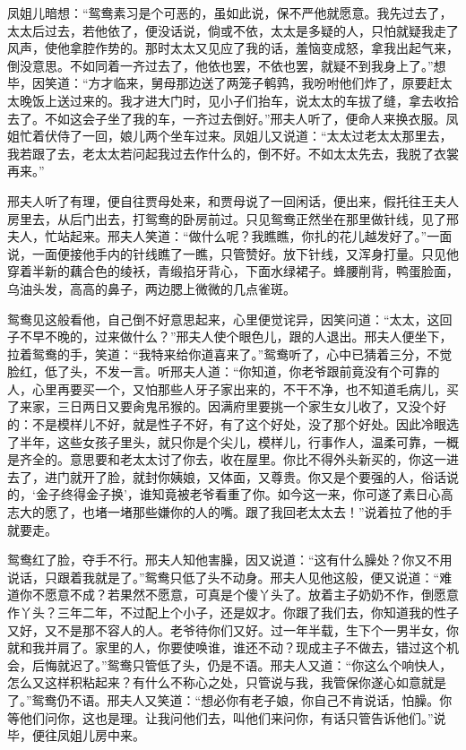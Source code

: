 \documentclass[12pt,oneside]{book}
\begin{document}
凤姐儿暗想：“鸳鸯素习是个可恶的，虽如此说，保不严他就愿意。我先过去了，太太后过去，若他依了，便没话说，倘或不依，太太是多疑的人，只怕就疑我走了风声，使他拿腔作势的。那时太太又见应了我的话，羞恼变成怒，拿我出起气来，倒没意思。不如同着一齐过去了，他依也罢，不依也罢，就疑不到我身上了。”想毕，因笑道：“方才临来，舅母那边送了两笼子鹌鹑，我吩咐他们炸了，原要赶太太晚饭上送过来的。我才进大门时，见小子们抬车，说太太的车拔了缝，拿去收拾去了。不如这会子坐了我的车，一齐过去倒好。”邢夫人听了，便命人来换衣服。凤姐忙着伏侍了一回，娘儿两个坐车过来。凤姐儿又说道：“太太过老太太那里去，我若跟了去，老太太若问起我过去作什么的，倒不好。不如太太先去，我脱了衣裳再来。”

邢夫人听了有理，便自往贾母处来，和贾母说了一回闲话，便出来，假托往王夫人房里去，从后门出去，打鸳鸯的卧房前过。只见鸳鸯正然坐在那里做针线，见了邢夫人，忙站起来。邢夫人笑道：“做什么呢？我瞧瞧，你扎的花儿越发好了。”一面说，一面便接他手内的针线瞧了一瞧，只管赞好。放下针线，又浑身打量。只见他穿着半新的藕合色的绫袄，青缎掐牙背心，下面水绿裙子。蜂腰削背，鸭蛋脸面，乌油头发，高高的鼻子，两边腮上微微的几点雀斑。

鸳鸯见这般看他，自己倒不好意思起来，心里便觉诧异，因笑问道：“太太，这回子不早不晚的，过来做什么？”邢夫人使个眼色儿，跟的人退出。邢夫人便坐下，拉着鸳鸯的手，笑道：“我特来给你道喜来了。”鸳鸯听了，心中已猜着三分，不觉脸红，低了头，不发一言。听邢夫人道：“你知道，你老爷跟前竟没有个可靠的人，心里再要买一个，又怕那些人牙子家出来的，不干不净，也不知道毛病儿，买了来家，三日两日又要肏鬼吊猴的。因满府里要挑一个家生女儿收了，又没个好的：不是模样儿不好，就是性子不好，有了这个好处，没了那个好处。因此冷眼选了半年，这些女孩子里头，就只你是个尖儿，模样儿，行事作人，温柔可靠，一概是齐全的。意思要和老太太讨了你去，收在屋里。你比不得外头新买的，你这一进去了，进门就开了脸，就封你姨娘，又体面，又尊贵。你又是个要强的人，俗话说的，‘金子终得金子换’，谁知竟被老爷看重了你。如今这一来，你可遂了素日心高志大的愿了，也堵一堵那些嫌你的人的嘴。跟了我回老太太去！”说着拉了他的手就要走。

鸳鸯红了脸，夺手不行。邢夫人知他害臊，因又说道：“这有什么臊处？你又不用说话，只跟着我就是了。”鸳鸯只低了头不动身。邢夫人见他这般，便又说道：“难道你不愿意不成？若果然不愿意，可真是个傻丫头了。放着主子奶奶不作，倒愿意作丫头？三年二年，不过配上个小子，还是奴才。你跟了我们去，你知道我的性子又好，又不是那不容人的人。老爷待你们又好。过一年半载，生下个一男半女，你就和我并肩了。家里的人，你要使唤谁，谁还不动？现成主子不做去，错过这个机会，后悔就迟了。”鸳鸯只管低了头，仍是不语。邢夫人又道：“你这么个响快人，怎么又这样积粘起来？有什么不称心之处，只管说与我，我管保你遂心如意就是了。”鸳鸯仍不语。邢夫人又笑道：“想必你有老子娘，你自己不肯说话，怕臊。你等他们问你，这也是理。让我问他们去，叫他们来问你，有话只管告诉他们。”说毕，便往凤姐儿房中来。
\end{document}
